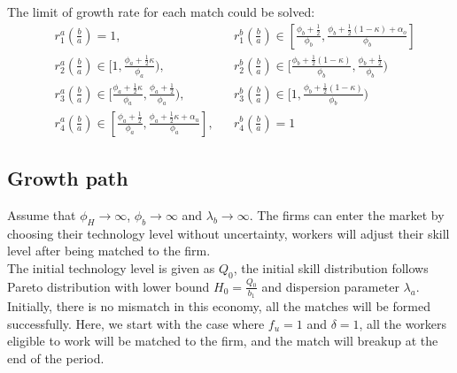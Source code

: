 \documentclass{article}
\newcommand{\1}{\mathbb{1}}
\begin{document}
The limit of growth rate for each match could be solved: 
\begin{align*}
&r_1^a(\frac{b}{a}) = 1 , &&  r_1^b(\frac{b}{a}) \in [\frac{\phi_b+\frac{1}{2}}{\phi_b},\frac{\phi_b+\frac{1}{2}(1-\kappa)+\alpha_o}{\phi_b}]\\
&r_2^a(\frac{b}{a}) \in [1,\frac{\phi_a+\frac{1}{2}\kappa}{\phi_a}) , &&  r_2^b(\frac{b}{a}) \in [\frac{\phi_b+\frac{1}{2}(1-\kappa)}{\phi_b},\frac{\phi_b+\frac{1}{2}}{\phi_b})\\
&r_3^a(\frac{b}{a})  \in [\frac{\phi_a+\frac{1}{2}\kappa}{\phi_a},\frac{\phi_a+\frac{1}{2}}{\phi_a}) , && r_3^b(\frac{b}{a}) \in [1,\frac{\phi_b+\frac{1}{2}(1-\kappa)}{\phi_b})\\
&r_4^a(\frac{b}{a}) \in [\frac{\phi_a+\frac{1}{2}}{\phi_a}, \frac{\phi_a+\frac{1}{2}\kappa+\alpha_u}{\phi_a}],  && r_4^b(\frac{b}{a}) = 1 
\end{align*}

\subsection{Growth path}
Assume that $\phi_H \to \infty$, $\phi_b \to \infty$ and $\lambda_b \to \infty$. The firms can enter the market by choosing their technology level without uncertainty, workers will adjust their skill level after being matched to the firm. \\

The initial technology level is given as $Q_0$, the initial skill distribution follows Pareto distribution with lower bound $H_0 = \frac{Q_0}{b_1}$ and dispersion parameter $\lambda_a$. Initially, there is no mismatch in this economy, all the matches will be formed successfully. Here, we start with the case where $f_u=1$ and $\delta=1$, all the workers eligible to work will be matched to the firm, and the match will breakup at the end of the period. \\
\end{document}
